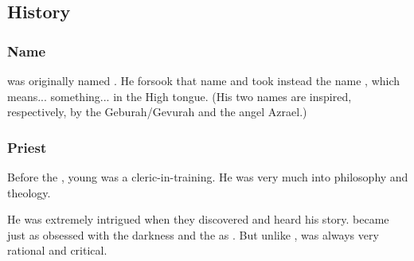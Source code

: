 









\subsection{History}





\subsubsection{Name}
\Azraid was originally named \Gevural.
He forsook that name and took instead the name \Azraid, which means... something... in the High \Resphan{} tongue. 
(His two names are inspired, respectively, by the \Sephirah{} Geburah/Gevurah and the angel Azrael.)






\subsubsection{Priest}
Before the , young \Gevural{} was a cleric-in-training. 
He was very much into philosophy and theology. 

He was extremely intrigued when they discovered \Semiza{} and heard his story. 
\Gevural{} became just as obsessed with the darkness and the \banes{} as \Zachirah. 
But unlike \Zachirah, \Gevural{} was always very rational and critical. 






